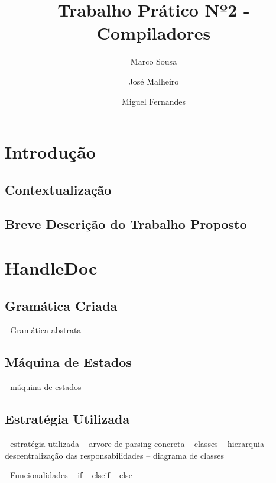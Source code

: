 \documentclass[runningheads]{llncs}
\begin{document}
%
\title{Trabalho Prático Nº2 - Compiladores}
%
%
\author{Marco Sousa \and
José Malheiro \and
Miguel Fernandes}
%
%
\maketitle              %
%
\begin{abstract}

\end{abstract}
%
%
%
\section{Introdução}
\subsection{Contextualização} 



\subsection{Breve Descrição do Trabalho Proposto}



\section{HandleDoc}
\subsection{Gramática Criada}
- Gramática abstrata

\subsection{Máquina de Estados}
- máquina de estados

\subsection{Estratégia Utilizada}
- estratégia utilizada
-- arvore de parsing concreta
-- classes
-- hierarquia
-- descentralização das responsabilidades
-- diagrama de classes

- Funcionalidades
-- if 
-- elseif
-- else 
\end{document}
